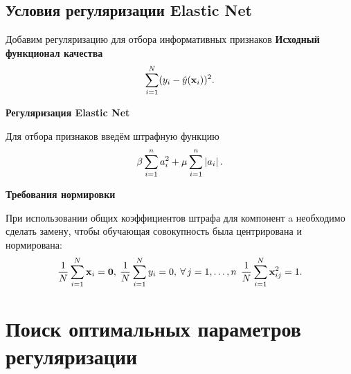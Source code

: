 \documentclass[unicode,lefteqn,c,hyperref={pdfpagelabels=false}]{beamer}
\begin{document}
\subsection{Условия регуляризации Elastic Net}
\begin{frame}{Добавим регуляризацию для отбора информативных признаков}
	\vspace{-5pt}
	\textbf{Исходный функционал качества}
	\vspace{-5pt}
	\begin{equation*}
		\sum\limits_{i=1}^N(y_i - \hat y(\boldsymbol{\mathbf{x}}_i))^2.
	\end{equation*}

	\smallskip
	\textbf{Регуляризация Elastic Net}

	Для отбора признаков введём штрафную функцию
	\begin{equation*}
		\beta\sum\limits_{i=1}^n a_i^2 + \mu\sum\limits_{i=1}^n\left|a_i\right|.
	\end{equation*}

	\smallskip
	\textbf{Требования нормировки}

	При использовании общих коэффициентов штрафа для компонент \mb a необходимо сделать замену, чтобы обучающая совокупность была центрирована и нормирована:
	\begin{equation*}
		\frac1N\sum\limits_{i=1}^N\boldsymbol{\mathbf{x}}_i = \boldsymbol{\mathbf{0}}, \:
		\frac1N\sum\limits_{i=1}^N y_i = 0, \:
		\forall\,j=1,\ldots, n\: \: \frac1N\sum\limits_{i=1}^N\boldsymbol{\mathbf{x}}_{ij}^2 = 1.
	\end{equation*}
\end{frame}

\def\lams{{\mu,\beta}}
\section{Поиск оптимальных параметров регуляризации}
\end{document}
